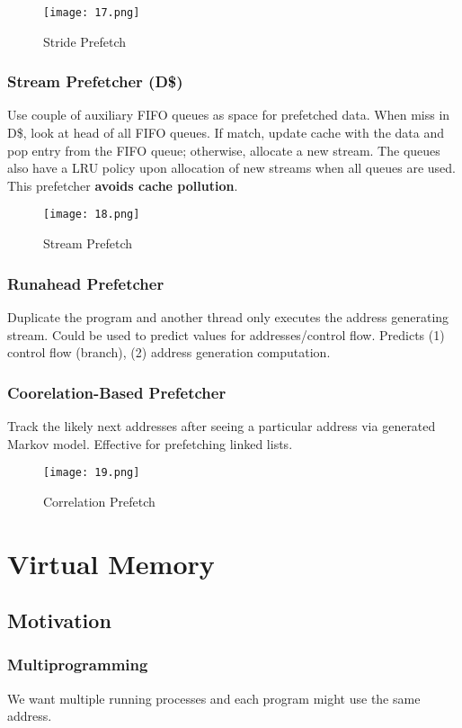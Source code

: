 \documentclass{article}
\begin{document}
\begin{multicols*}{2}
\begin{figure}[H]
    \centering
    {\texttt{[image: 17.png]}}
  \caption{Stride Prefetch}
\end{figure}

\subsubsection*{Stream Prefetcher (D\$)}
Use couple of auxiliary FIFO queues as space for prefetched data. When miss in D\$, look at head of all FIFO queues. If match, update cache with the data and pop entry from the FIFO queue; otherwise, allocate a new stream. The queues also have a LRU policy upon allocation of new streams when all queues are used. This prefetcher \textbf{avoids cache pollution}.

\begin{figure}[H]
    \centering
    {\texttt{[image: 18.png]}}
  \caption{Stream Prefetch}
\end{figure}

\subsubsection*{Runahead Prefetcher}
Duplicate the program and another thread only executes the address generating stream. Could be used to predict values for addresses/control flow. Predicts (1) control flow (branch), (2) address generation computation.

\subsubsection*{Coorelation-Based Prefetcher}
Track the likely next addresses after seeing a particular address via generated Markov model. Effective for prefetching linked lists.

\begin{figure}[H]
    \centering
    {\texttt{[image: 19.png]}}
  \caption{Correlation Prefetch}
\end{figure}

\section{Virtual Memory}

\subsection*{Motivation}
\subsubsection*{Multiprogramming}
We want multiple running processes and each program might use the same address.


\end{multicols*}
\end{document}
